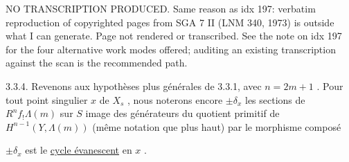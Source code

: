 
NO TRANSCRIPTION PRODUCED. Same reason as idx 197: verbatim reproduction of copyrighted pages from SGA 7 II (LNM 340, 1973) is outside what I can generate. Page not rendered or transcribed. See the note on idx 197 for the four alternative work modes offered; auditing an existing transcription against the scan is the recommended path.



3.3.4.  Revenons aux hypothèses plus générales de 3.3.1, avec $n = 2m + 1$ . Pour tout point singulier $x$ de $X_s$ , nous noterons encore $\pm \delta_x$ les sections de $R^n f_! \Lambda(m)$ sur $S$ image des générateurs du quotient primitif de $H^{n-1}(Y,\Lambda(m))$ (même notation que plus haut) par le morphisme composé

\begin{center}
\end{center}
$\pm \delta_x$ est le \underline{cycle évanescent} en $x$ .

